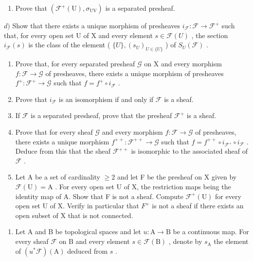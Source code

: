 \begin{enumerate}
\def\labelenumi{\alph{enumi})}
\setcounter{enumi}{2}
\tightlist
\item
  Prove that \((\mathcal{F}^{+}(\mathrm{U}),\sigma_{\mathrm{UV}})\) is a separated presheaf.
\end{enumerate}

\(d)\) Show that there exists a unique morphism of presheaves \(i_{\mathcal{F}}: \mathcal{F} \to \mathcal{F}^{+}\) such that, for every open set U of X and every element \(s \in \mathcal{F}(U)\) , the section \(i_{\mathcal{F}}(s)\) is the class of the element ( \(\{U\}, (s_U)_{U \in \{U\}}\) ) of \(S_U(\mathcal{F})\) .

\begin{enumerate}
\def\labelenumi{\alph{enumi})}
\setcounter{enumi}{4}
\item
  Prove that, for every separated presheaf \(\mathcal{G}\) on X and every morphism \(f\colon \mathcal{F} \to \mathcal{G}\) of presheaves, there exists a unique morphism of presheaves \(f^{+}\colon \mathcal{F}^{+} \to \mathcal{G}\) such that \(f = f^{+} \circ i_{\mathcal{F}}\) .
\item
  Prove that \(i_{\mathcal{F}}\) is an isomorphism if and only if \(\mathcal{F}\) is a sheaf.
\item
  If \(\mathcal{F}\) is a separated presheaf, prove that the presheaf \(\mathcal{F}^{+}\) is a sheaf.
\item
  Prove that for every sheaf \(\mathcal{G}\) and every morphism \(f\colon \mathcal{F}\to \mathcal{G}\) of presheaves, there exists a unique morphism \(f^{++}\colon \mathcal{F}^{++}\to \mathcal{G}\) such that \(f = f^{++}\circ i_{\mathcal{F}^+}\circ i_{\mathcal{F}}\) . Deduce from this that the sheaf \(\mathcal{F}^{++}\) is isomorphic to the associated sheaf of \(\mathcal{F}\) .
\item
  Let A be a set of cardinality \(\geqslant2\) and let F be the presheaf on X given by \(\mathcal{F}(\mathrm{U})=\mathrm{A}\) . For every open set U of X, the restriction maps being the identity map of A. Show that F is not a sheaf. Compute \(\mathcal{F}^{+}(\mathrm{U})\) for every open set U of X. Verify in particular that \(F^{+}\) is not a sheaf if there exists an open subset of X that is not connected.
\end{enumerate}

\begin{enumerate}
\def\labelenumi{\arabic{enumi})}
\setcounter{enumi}{4}
\tightlist
\item
  Let A and B be topological spaces and let \(u\colon\mathrm{A}\to\mathrm{B}\) be a continuous map. For every sheaf \(\mathcal{F}\) on B and every element \(s\in\mathcal{F}(\mathrm{B})\) , denote by \(s_{\mathrm{A}}\) the element of \((u^{*}\mathcal{F})(\mathrm{A})\) deduced from \(s\) .
\end{enumerate}


